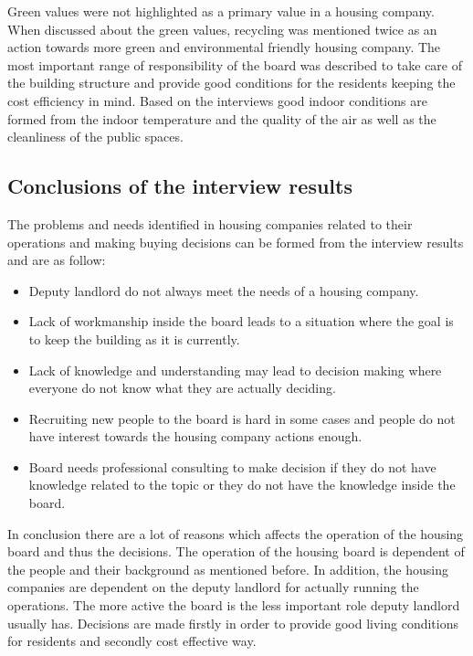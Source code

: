 Green values were not highlighted as a primary value in a housing company. When discussed about the green values, recycling was mentioned twice as an action towards more green and environmental friendly housing company. The most important range of responsibility of the board was described to take care of the building structure and provide good conditions for the residents keeping the cost efficiency in mind. Based on the interviews good indoor conditions are formed from the indoor temperature and the quality of the air as well as the cleanliness of the public spaces.

\subsection{Conclusions of the interview results}

The problems and needs identified in housing companies related to their operations and making buying decisions can be formed from the interview results and are as follow:
\begin{itemize}
	\setlength{\itemsep}{1pt}
	\item Deputy landlord do not always meet the needs of a housing company.
	\item Lack of workmanship inside the board leads to a situation where the goal is to keep the building as it is currently.
	\item Lack of knowledge and understanding may lead to decision making where everyone do not know what they are actually deciding.
	\item Recruiting new people to the board is hard in some cases and people do not have interest towards the housing company actions enough.
	\item Board needs professional consulting to make decision if they do not have knowledge related to the topic or they do not have the knowledge inside the board.
\end{itemize}

In conclusion there are a lot of reasons which affects the operation of the housing board and thus the decisions. The operation of the housing board is dependent of the people and their background as mentioned before. In addition, the housing companies are dependent on the deputy landlord for actually running the operations. The more active the board is the less important role deputy landlord usually has. Decisions are made firstly in order to provide good living conditions for residents and secondly cost effective way.

